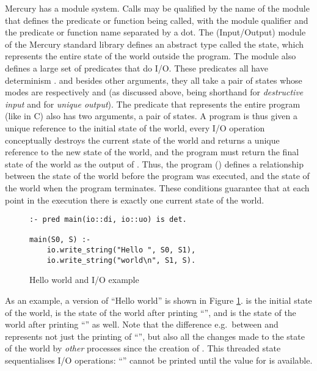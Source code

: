 Mercury has a module system.
Calls may be qualified by the name of the module
that defines the predicate or function being called,
with the module qualifier and the predicate or function name
separated by a dot.
The \io (Input/Output) module of the Mercury standard library
defines an abstract type called the \io state,
which represents the entire state of the world outside the program.
The \io module also defines a large set of predicates that do I/O.
These predicates all have determinism \ddet.
and besides other arguments,
they all take a pair of \io states
whose modes are respectively \di and \uo
(as discussed above, \di being shorthand for \emph{destructive input}
and \uo for \emph{unique output}).
The  predicate that represents the entire program
(like  in C)
also has two arguments, a  pair of \io states.
A program is thus given
a unique reference to the initial state of the world,
every I/O operation conceptually destroys the current state of the world
and returns a unique reference to the new state of the world,
and the program must return the final state of the world
as the output of .
Thus, the program () defines a relationship between the state
of the world before the program was executed,
and the state of the world when the program terminates.
These conditions guarantee that at each point in the execution
there is exactly one current state of the world.

\begin{figure}
\begin{verbatim}
:- pred main(io::di, io::uo) is det.

main(S0, S) :-
    io.write_string("Hello ", S0, S1),
    io.write_string("world\n", S1, S).
\end{verbatim}
\caption{Hello world and I/O example}
\label{fig:hello}
\end{figure}

As an example, a version of ``Hello world'' is shown in Figure
\ref{fig:hello}.
 is the initial state of the world,
 is the state of the world after printing ``'',
and  is the state of the world
after printing ``'' as well.
Note that the difference e.g.\ between  and 
represents not just the printing of ``'',
but also all the changes made to the state of the world
by \emph{other} processes since the creation of .
This threaded state sequentialises I/O operations:
``'' cannot be printed until the value for 
is available.

